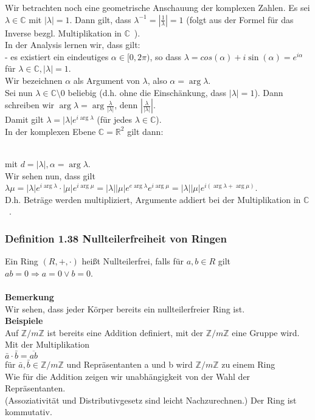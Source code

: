 \documentclass{report}
\newcommand{\lb}{\lambda}
\newcommand{\R}{\mathbb{R}}
\newcommand{\Z}{\mathbb{Z}}
\newcommand{\C}{\mathbb{C}}
\newcommand{\mR}{$\mathbb{R}$\ }
\newcommand{\mC}{$\mathbb{C}$\ }
\newcommand{\al}{\alpha}
\theoremstyle{customrem}
\theoremstyle{customdef}
\begin{document}
\begin{enumerate}
{Wir betrachten noch eine geometrische Anschauung der komplexen Zahlen. Es sei $\lb \in \C$ mit $|\lb| = 1$. Dann gilt, dass $\lb^{-1} = |\frac{1}{\lb}| = 1$  (folgt aus der Formel für das Inverse bezgl. Multiplikation in \mC).\\
In der Analysis lernen wir, dass gilt:\\
- es existiert ein eindeutiges $\al \in [0, 2\pi)$, so dass $\lb = cos(\al) + i \sin(\al) = e^{i\al}$ für $\lb \in \C, |\lb| = 1$.\\
Wir bezeichnen $\al$ als Argument von $\lb$, also $\al = \arg \lb$.\\
Sei nun $\lb \in \C \setminus 0$ beliebig (d.h. ohne die Einschänkung, dass $|\lb| = 1$). Dann schreiben wir $\arg \lb = \arg \frac{\lb}{|\lb|}$, denn $|\frac{\lb}{|\lb|}|$.\\
Damit gilt $\lb = |\lb| e^{i \arg \lb}$ (für jedes $\lb \in \C$).\\
In der komplexen Ebene $\C = \R^2$ gilt dann:\\
\\
mit $d = |\lb|, \al = \arg \lb$.\\
Wir sehen nun, dass gilt $\lb \mu = |\lb| e^{i \arg \lb} \cdot  |\mu| e^{i \arg \mu} = |\lb||\mu| e^{e \arg\lb} e^{i \arg \mu} = |\lb||\mu| e^{i (\arg\lb + \arg \mu)}$.\\
D.h. Beträge werden multipliziert, Argumente addiert bei der Multiplikation in \mC.
}
\end{enumerate}

\subsubsection{Definition 1.38 Nullteilerfreiheit von Ringen}
Ein Ring $(R, +, \cdot)$ hei\ss{}t Nullteilerfrei, falls für $a, b \in R$ gilt $ab = 0 \Rightarrow a = 0 \lor b = 0$.\\
\\
\textbf{Bemerkung}\\
Wir sehen, dass jeder Körper bereits ein nullteilerfreier Ring ist.\\
\textbf{Beispiele}\\
Auf $\Z/m\Z$ ist bereits eine Addition definiert, mit der $\Z/m\Z$ eine Gruppe wird. Mit der Multiplikation\\
$\bar{a} \cdot \bar{b} = \overline{ab}$\\
für $\bar{a}, \bar{b} \in \Z / m\Z$ und Repräsentanten a und b wird $\Z/m\Z$ zu einem Ring\\
Wie für die Addition zeigen wir unabhängigkeit von der Wahl der Repräsentanten.\\
(Assoziativität und Distributivgesetz sind leicht Nachzurechnen.) Der Ring ist kommutativ.
\end{document}

